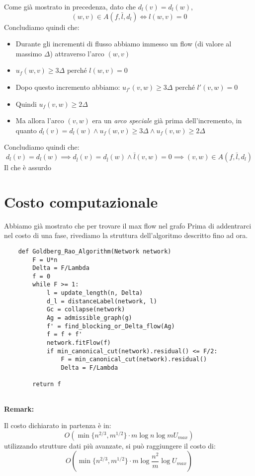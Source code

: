     Come già mostrato in precedenza, dato che $d_l(v) = d_l(w)$, \[(w,v)\in A(f,\bar{l}, d_l) \iff l(w,v) = 0\]
    Concludiamo quindi che: 
    \begin{itemize}
        \item Durante gli incrementi di flusso abbiamo immesso un flow (di valore al massimo $\Delta$) attraverso l'arco $(w,v)$
        \item $u_f(w,v) \ge 3\Delta$ perché $l(w,v) = 0$
        \item Dopo questo incremento abbiamo: $u_{f'}(v,w) \ge 3\Delta$ perché  $l'(v,w) = 0$
        \item Quindi $u_f(v,w) \ge 2\Delta$
        \item Ma allora l'arco $(v,w)$ era un \textit{arco speciale} già prima dell'incremento, in quanto $d_l(v) = d_l(w) \land u_f(w,v) \ge 3\Delta \land u_f(v,w) \ge 2\Delta$
    \end{itemize}
    Concludiamo quindi che: 
    \[d_l(v) = d_l(w) \implies d_{\bar{l}}(v) = d_{\bar{l}}(w) \land \bar{l}(v,w) = 0 \implies (v,w) \in A(f,\bar{l}, d_l)\]
    Il che è assurdo 
    \QED

\section{Costo computazionale}
    Abbiamo già mostrato che per trovare il max flow nel grafo 
    Prima di addentrarci nel costo di una fase, rivediamo la struttura dell'algoritmo descritto fino ad ora.
    \begin{verbatim}
    def Goldberg_Rao_Algorithm(Network network)
        F = U*n
        Delta = F/Lambda
        f = 0
        while F >= 1:
            l = update_length(n, Delta)
            d_l = distanceLabel(network, l)
            Gc = collapse(network)
            Ag = admissible_graph(g)
            f' = find_blocking_or_Delta_flow(Ag)
            f = f + f'
            network.fitFlow(f)
            if min_canonical_cut(network).residual() <= F/2: 
                F = min_canonical_cut(network).residual()
                Delta = F/Lambda

        return f
        
    \end{verbatim}
\textbf{Remark:}
        
        Il costo dichiarato in partenza è in:
        \[O(\min \{n^{2/3}, m^{1/2}\}\cdot m \log n\log m U_{max})\]
        utilizzando strutture dati più avanzate, si può raggiungere il costo di:
        \[O(\min \{n^{2/3}, m^{1/2}\}\cdot m \log \frac{n^2}{m}\log U_{max})\]


